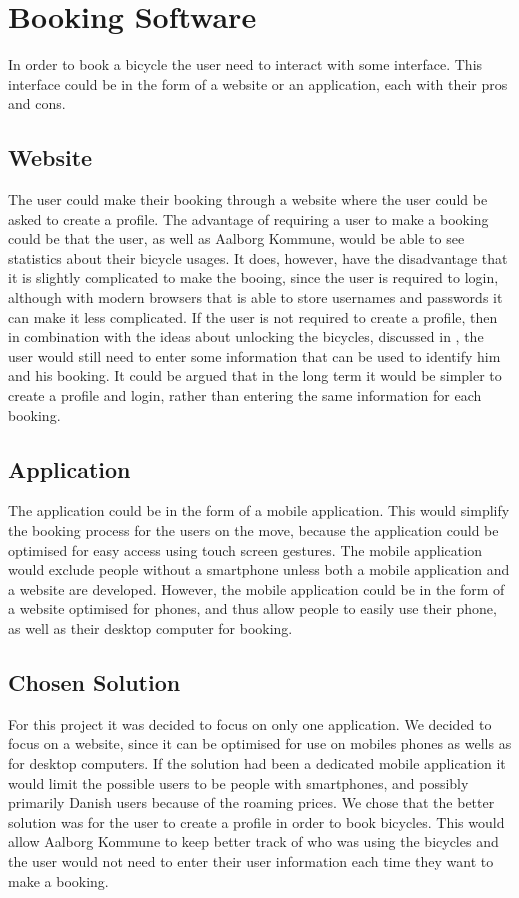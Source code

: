 \section{Booking Software}
In order to book a bicycle the user need to interact with some interface.
This interface could be in the form of a website or an application, each with their pros and cons.

\subsection{Website}
The user could make their booking through a website where the user could be asked to create a profile.
The advantage of requiring a user to make a booking could be that the user, as well as Aalborg Kommune, would be able to see statistics about their bicycle usages.
It does, however, have the disadvantage that it is slightly complicated to make the booing, since the user is required to login, although with modern browsers that is able to store usernames and passwords it can make it less complicated.
If the user is not required to create a profile, then in combination with the ideas about unlocking the bicycles, discussed in , the user would still need to enter some information that can be used to identify him and his booking.
It could be argued that in the long term it would be simpler to create a profile and login, rather than entering the same information for each booking.

\subsection{Application}
The application could be in the form of a mobile application. 
This would simplify the booking process for the users on the move, because the application could be optimised for easy access using touch screen gestures.
The mobile application would exclude people without a smartphone unless both a mobile application and a website are developed.
However, the mobile application could be in the form of a website optimised for phones, and thus allow people to easily use their phone, as well as their desktop computer for booking. 

\subsection{Chosen Solution}
For this project it was decided to focus on only one application.
We decided to focus on a website, since it can be optimised for use on mobiles phones as wells as for desktop computers. 
If the solution had been a dedicated mobile application it would limit the possible users to be people with smartphones, and possibly primarily Danish users because of the roaming prices.
We chose that the better solution was for the user to create a profile in order to book bicycles. 
This would allow Aalborg Kommune to keep better track of who was using the bicycles and the user would not need to enter their user information each time they want to make a booking.